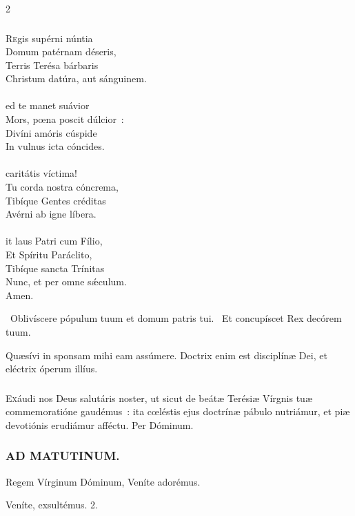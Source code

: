 \documentclass[9pt,twoside]{extarticle}
\begin{document}
\begin{multicols}{2}
{\subsubsection*{\center {}}
\begin{center}\end{center}
\lettrine{R}egis supérni núntia\\
Domum patérnam déseris,\\
Terris Terésa bárbaris\\
Christum datúra, aut sánguinem.\\
\\
ed te manet suávior\\
Mors, pœna poscit dúlcior~:\\
Divíni amóris cúspide\\
In vulnus icta cóncides.\\
\\
 caritátis víctima!\\
Tu corda nostra cóncrema,\\
Tibíque Gentes créditas\\
Avérni ab igne líbera.\\
\\
it laus Patri cum Fílio,\\
Et Spíritu Paráclito,\\
Tibíque sancta Trínitas\\
Nunc, et per omne sǽculum.\\
Amen.

\begin{tightlist}{}
\item {}~Oblivíscere pópulum tuum et domum patris tui. ~Et concupíscet Rex decórem tuum.
\item {} Quæsívi in sponsam mihi eam assúmere. Doctrix enim est disciplínæ Dei, et eléctrix óperum illíus.
\end{tightlist}

\subsubsection*{\center {}}
\lettrine{E}xáudi nos Deus salutáris noster, ut sicut de beátæ Terésiæ Vírgnis tuæ commemoratióne gaudémus~: ita cœléstis ejus doctrínæ pábulo nutriámur, et piæ devotiónis erudiámur afféctu. Per Dóminum.

\subsubsection*{\center \textsc{AD MATUTINUM.}}
\begin{tightlist}{}
\item {} Regem Vírginum Dóminum, \textred{*} Veníte adorémus.
\item {} Veníte, exsultémus. 2.
\item {}
\end{tightlist}

}
\end{multicols}
\end{document}
